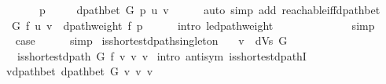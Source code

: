 \begin{isabellebody}
\ {}\isanewline
\ \ \isamarkupfalse%
\ \isamarkupfalse%
\ p\ \isanewline
\ \ \ \ {\isachardoublequoteopen}dpath{\isacharunderscore}{\kern0pt}bet\ G\ p\ u\ v{\isachardoublequoteclose}\isanewline
\ \ \ \ \isamarkupfalse%
\ {\isacharparenleft}{\kern0pt}auto\ simp\ add{\isacharcolon}{\kern0pt}\ reachable{\isacharunderscore}{\kern0pt}iff{\isacharunderscore}{\kern0pt}dpath{\isacharunderscore}{\kern0pt}bet{\isacharparenright}{\kern0pt}\isanewline
\ \ \isamarkupfalse%
\ {\isachardoublequoteopen}{\isasymdelta}\ G\ f\ u\ v\ {\isasymle}\ dpath{\isacharunderscore}{\kern0pt}weight\ f\ p{\isachardoublequoteclose}\isanewline
\ \ \ \ \isamarkupfalse%
\ {\isacharparenleft}{\kern0pt}intro\ {\isasymdelta}{\isacharunderscore}{\kern0pt}le{\isacharunderscore}{\kern0pt}dpath{\isacharunderscore}{\kern0pt}weight{\isacharparenright}{\kern0pt}\isanewline
\ \ \isamarkupfalse%
\ \isamarkupfalse%
\ {\isachardoublequoteopen}{\isachardot}{\kern0pt}{\isachardot}{\kern0pt}{\isachardot}{\kern0pt}\ {\isacharless}{\kern0pt}\ {\isasyminfinity}{\isachardoublequoteclose}\isanewline
\ \ \ \ \isamarkupfalse%
\ simp\isanewline
\ \ \isamarkupfalse%
\ \isamarkupfalse%
\ {\isacharquery}{\kern0pt}case\isanewline
\ \ \ \ \isamarkupfalse%
\ simp\isanewline
{}\isamarkupfalse%
%
\endisatagproof
{\isafoldproof}%
%
\isadelimproof
\isanewline
%
\endisadelimproof
%
\isadeliminvisible
\isanewline
%
\endisadeliminvisible
%
\isataginvisible
{}\isamarkupfalse%
\ is{\isacharunderscore}{\kern0pt}shortest{\isacharunderscore}{\kern0pt}dpath{\isacharunderscore}{\kern0pt}singleton{\isacharcolon}{\kern0pt}\isanewline
\ \ \ {\isachardoublequoteopen}v\ {\isasymin}\ dVs\ G{\isachardoublequoteclose}\isanewline
\ \ \ {\isachardoublequoteopen}is{\isacharunderscore}{\kern0pt}shortest{\isacharunderscore}{\kern0pt}dpath\ G\ f\ {\isacharbrackleft}{\kern0pt}v{\isacharbrackright}{\kern0pt}\ v\ v{\isachardoublequoteclose}%
\endisataginvisible
{\isafoldinvisible}%
%
\isadeliminvisible
\isanewline
%
\endisadeliminvisible
%
\isadelimproof
%
\endisadelimproof
%
\isatagproof
{}\isamarkupfalse%
\ {\isacharparenleft}{\kern0pt}intro\ antisym\ is{\isacharunderscore}{\kern0pt}shortest{\isacharunderscore}{\kern0pt}dpathI{\isacharparenright}{\kern0pt}\isanewline
\ \ \isamarkupfalse%
\ v{\isacharunderscore}{\kern0pt}dpath{\isacharunderscore}{\kern0pt}bet{\isacharcolon}{\kern0pt}\ {\isachardoublequoteopen}dpath{\isacharunderscore}{\kern0pt}bet\ G\ {\isacharbrackleft}{\kern0pt}v{\isacharbrackright}{\kern0pt}\ v\ v{\isachardoublequoteclose}\isanewline

\end{isabellebody}
